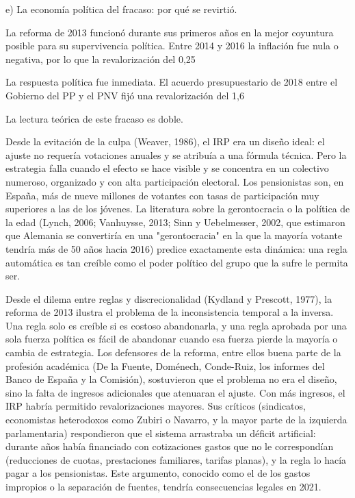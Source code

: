 \documentclass[10pt,a4paper]{article}
\begin{document}
e) La economía política del fracaso: por qué se revirtió.

La reforma de 2013 funcionó durante sus primeros años en la mejor coyuntura posible para su supervivencia política. Entre 2014 y 2016 la inflación fue nula o negativa, por lo que la revalorización del 0,25%

La respuesta política fue inmediata. El acuerdo presupuestario de 2018 entre el Gobierno del PP y el PNV fijó una revalorización del 1,6%

La lectura teórica de este fracaso es doble.

Desde la evitación de la culpa (Weaver, 1986), el IRP era un diseño ideal: el ajuste no requería votaciones anuales y se atribuía a una fórmula técnica. Pero la estrategia falla cuando el efecto se hace visible y se concentra en un colectivo numeroso, organizado y con alta participación electoral. Los pensionistas son, en España, más de nueve millones de votantes con tasas de participación muy superiores a las de los jóvenes. La literatura sobre la gerontocracia o la política de la edad (Lynch, 2006; Vanhuysse, 2013; Sinn y Uebelmesser, 2002, que estimaron que Alemania se convertiría en una "gerontocracia" en la que la mayoría votante tendría más de 50 años hacia 2016) predice exactamente esta dinámica: una regla automática es tan creíble como el poder político del grupo que la sufre le permita ser.

Desde el dilema entre reglas y discrecionalidad (Kydland y Prescott, 1977), la reforma de 2013 ilustra el problema de la inconsistencia temporal a la inversa. Una regla solo es creíble si es costoso abandonarla, y una regla aprobada por una sola fuerza política es fácil de abandonar cuando esa fuerza pierde la mayoría o cambia de estrategia. Los defensores de la reforma, entre ellos buena parte de la profesión académica (De la Fuente, Doménech, Conde-Ruiz, los informes del Banco de España y la Comisión), sostuvieron que el problema no era el diseño, sino la falta de ingresos adicionales que atenuaran el ajuste. Con más ingresos, el IRP habría permitido revalorizaciones mayores. Sus críticos (sindicatos, economistas heterodoxos como Zubiri o Navarro, y la mayor parte de la izquierda parlamentaria) respondieron que el sistema arrastraba un déficit artificial: durante años había financiado con cotizaciones gastos que no le correspondían (reducciones de cuotas, prestaciones familiares, tarifas planas), y la regla lo hacía pagar a los pensionistas. Este argumento, conocido como el de los gastos impropios o la separación de fuentes, tendría consecuencias legales en 2021.
\end{document}

